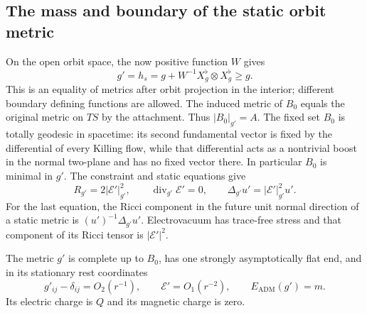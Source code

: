 \subsection{The mass and boundary of the static orbit metric}
\label{ri:mass-area}

On the open orbit space, the now positive function $W$ gives
\begin{equation}
\label{ri:orbit-metric}
 g'=h_s=g+W^{-1}X_g^\flat\otimes X_g^\flat\geq g.
\end{equation}
This is an equality of metrics after orbit projection in the
interior; different boundary defining functions are allowed.
The induced metric of $B_0$ equals the original metric on $TS$ by
the attachment.  Thus $|B_0|_{g'}=A$.
The fixed set $B_0$ is totally geodesic in spacetime: its second
fundamental vector is fixed by the differential of every Killing
flow, while that differential acts as a nontrivial boost in the
normal two-plane and has no fixed vector there.  In particular
$B_0$ is minimal in $g'$.  The constraint and static equations give
\begin{equation}
\label{ri:static-equations}
 R_{g'}=2|\mathcal E'|_{g'}^2,\qquad
 \operatorname{div}_{g'}\mathcal E'=0,\qquad
 \Delta_{g'}u'=|\mathcal E'|_{g'}^2u'.
\end{equation}
For the last equation, the Ricci component in the future unit
normal direction of a static metric is $(u')^{-1}\Delta_{g'}u'$.
Electrovacuum has trace-free stress and that component of its
Ricci tensor is $|\mathcal E'|^2$.

\begin{lemma}
\label{ri:static-mass}
The metric $g'$ is complete up to $B_0$, has one strongly
asymptotically flat end, and in its stationary rest coordinates
\[
 g'_{ij}-\delta_{ij}=O_2(r^{-1}),\qquad
 \mathcal E'=O_1(r^{-2}),\qquad E_{\mathrm{ADM}}(g')=m.
\]
Its electric charge is $Q$ and its magnetic charge is zero.
\end{lemma}

